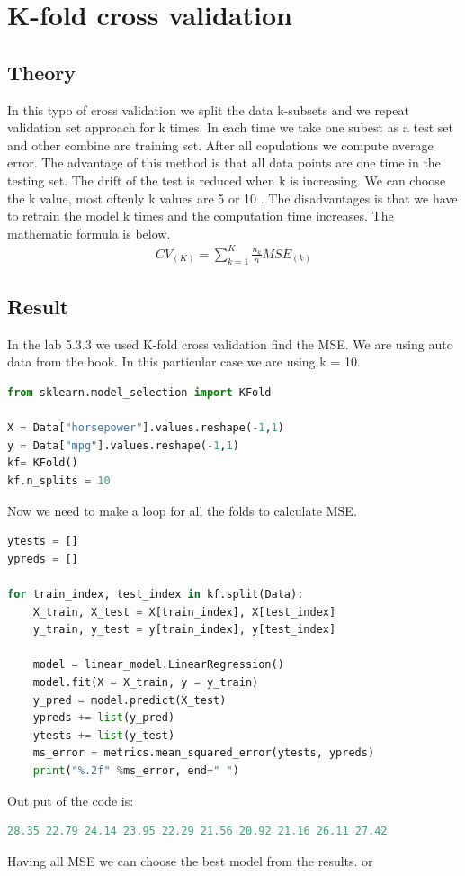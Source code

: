 \section {K-fold cross validation}
\subsection{Theory}

In this typo of cross validation we split the data k-subsets and we repeat validation set approach for k times. In each time we take one subest as a test set and other combine are training set. After all copulations we compute average error. The advantage of this method is that all data points are one time in the testing set. The drift of the test is reduced when k is increasing. We can choose the k value, most oftenly k values are 5 or 10 . The disadvantages is that we have to retrain the model k times and the computation time increases. The mathematic formula is below. 
\begin{align}\label{fo:k-fold}
CV_{(K)} = \sum_{k=1}^{K}  \frac {n_{k}}{n}MSE_{(k)}
\end{align}

\subsection{Result}
In the lab 5.3.3 we used K-fold cross validation find the MSE. We are using auto data from the book. In this particular case we are using k = 10. 
\begin{lstlisting}[language=Python]
from sklearn.model_selection import KFold

X = Data["horsepower"].values.reshape(-1,1) 
y = Data["mpg"].values.reshape(-1,1)
kf= KFold()
kf.n_splits = 10
\end{lstlisting}
Now we need to make a loop for all the folds to calculate MSE.   

\begin{lstlisting}[language=Python]
ytests = []
ypreds = []

for train_index, test_index in kf.split(Data):
	X_train, X_test = X[train_index], X[test_index]
	y_train, y_test = y[train_index], y[test_index]

	model = linear_model.LinearRegression()
	model.fit(X = X_train, y = y_train)
	y_pred = model.predict(X_test)  
	ypreds += list(y_pred)
	ytests += list(y_test)
	ms_error = metrics.mean_squared_error(ytests, ypreds)
	print("%.2f" %ms_error, end=" ")
\end{lstlisting}
Out put of the code is:
\begin{lstlisting}[language=Python]
28.35 22.79 24.14 23.95 22.29 21.56 20.92 21.16 26.11 27.42 
\end{lstlisting}
Having all MSE we can choose the best model from the results. or 

